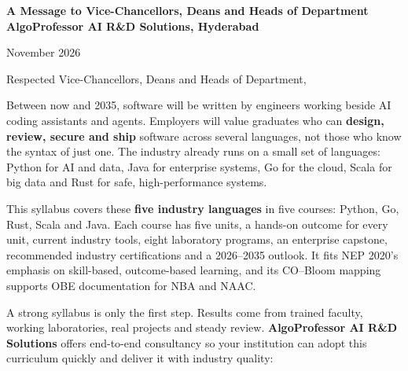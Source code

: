 \clearpage
\thispagestyle{fancy}
\begin{tcolorbox}[enhanced,colback=white,colframe=chakra,boxrule=0.8pt,arc=2pt,
  borderline north={4pt}{0pt}{saffron},borderline south={4pt}{0pt}{indiagreen},
  left=10pt,right=10pt,top=6pt,bottom=6pt]
\centering
{\color{chakra}\LARGE\bfseries A Message to Vice-Chancellors, Deans and Heads of Department}\\[4pt]
{\color{saffron!85!black}\bfseries AlgoProfessor AI R\&D Solutions, Hyderabad}
\end{tcolorbox}

\vspace{4pt}
{\small\raggedleft November 2026\par}

Respected Vice-Chancellors, Deans and Heads of Department,

Between now and 2035, software will be written by engineers working beside AI coding assistants and agents.
Employers will value graduates who can \textbf{design, review, secure and ship} software across several languages,
not those who know the syntax of just one. The industry already runs on a small set of languages: Python for AI and data,
Java for enterprise systems, Go for the cloud, Scala for big data and Rust for safe, high-performance systems.

This syllabus covers these \textbf{five industry languages} in five courses: Python, Go, Rust, Scala and Java.
Each course has five units, a hands-on outcome for every unit, current industry tools, eight laboratory programs, an enterprise
capstone, recommended industry certifications and a 2026--2035 outlook. It fits NEP 2020's emphasis on skill-based,
outcome-based learning, and its CO--Bloom mapping supports OBE documentation for NBA and NAAC.

A strong syllabus is only the first step. Results come from trained faculty, working laboratories, real
projects and steady review. \textbf{AlgoProfessor AI R\&D Solutions} offers end-to-end consultancy so your
institution can adopt this curriculum quickly and deliver it with industry quality:

